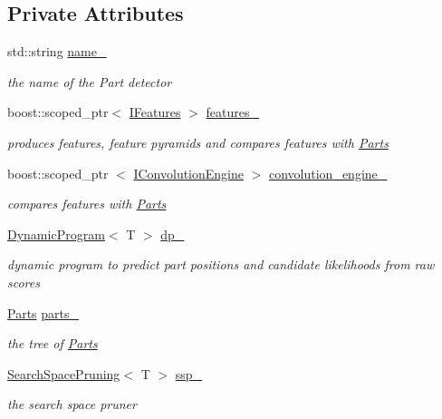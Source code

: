 \subsection*{\-Private \-Attributes}
\begin{DoxyCompactItemize}
\item 
std\-::string \hyperlink{classPartsBasedDetector_a776c766541fb4c2974c6b40a8f4f1c2f}{name\-\_\-}
\begin{DoxyCompactList}\small\item\em the name of the \-Part detector \end{DoxyCompactList}\item 
boost\-::scoped\-\_\-ptr$<$ \hyperlink{classIFeatures}{\-I\-Features} $>$ \hyperlink{classPartsBasedDetector_a6242f9b02fcb1a440cc431f2fc15521f}{features\-\_\-}
\begin{DoxyCompactList}\small\item\em produces features, feature pyramids and compares features with \hyperlink{classParts}{\-Parts} \end{DoxyCompactList}\item 
boost\-::scoped\-\_\-ptr\*
$<$ \hyperlink{classIConvolutionEngine}{\-I\-Convolution\-Engine} $>$ \hyperlink{classPartsBasedDetector_ad06eb05d590004fe4f6940544b90b2ba}{convolution\-\_\-engine\-\_\-}
\begin{DoxyCompactList}\small\item\em compares features with \hyperlink{classParts}{\-Parts} \end{DoxyCompactList}\item 
\hyperlink{classDynamicProgram}{\-Dynamic\-Program}$<$ \-T $>$ \hyperlink{classPartsBasedDetector_af78da81781a7ad393e9e150f02ecd129}{dp\-\_\-}
\begin{DoxyCompactList}\small\item\em dynamic program to predict part positions and candidate likelihoods from raw scores \end{DoxyCompactList}\item 
\hyperlink{classParts}{\-Parts} \hyperlink{classPartsBasedDetector_ad548ec9214858535eb6a0f3783d11664}{parts\-\_\-}
\begin{DoxyCompactList}\small\item\em the tree of \hyperlink{classParts}{\-Parts} \end{DoxyCompactList}\item 
\hyperlink{classSearchSpacePruning}{\-Search\-Space\-Pruning}$<$ \-T $>$ \hyperlink{classPartsBasedDetector_aae91c693f9d01e3e6cbd552d7f81e474}{ssp\-\_\-}
\begin{DoxyCompactList}\small\item\em the search space pruner \end{DoxyCompactList}\end{DoxyCompactItemize}


